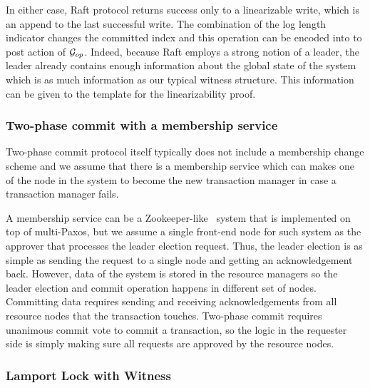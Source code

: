 In either case, Raft protocol returns success only to a
linearizable write, which is an append to the last successful write. The
combination of the log length indicator changes the committed index and this
operation can be encoded into to post action of $\mathcal{G}_{op}$. Indeed,
because Raft employs a strong notion of a leader, the leader already contains
enough information about the global state of the system which is as much
information as our typical witness structure. This information can be given to
the template for the linearizability proof. 


\subsubsection{Two-phase commit with a membership service}
Two-phase commit protocol itself typically does not include a membership
change scheme and we assume that there is a membership service which can makes one of the
node in the system to become the new transaction manager in case a transaction 
manager fails. 

A membership service can be a Zookeeper-like~\cite{zookeeper} system that is implemented on top
of multi-Paxos, but we assume a single front-end node for such system as the
approver that processes the leader election request. Thus, the leader election is 
as simple as sending the request to a single node and getting an acknowledgement back. 
However, data of the system is stored in the resource managers so the leader election and
commit operation happens in different set of nodes. Committing data requires sending
and receiving acknowledgements from all resource nodes that the transaction
touches.  Two-phase commit requires unanimous commit vote to commit a transaction, so the
logic in the requester side is simply making sure all requests are approved by
the resource nodes. 

\subsubsection{Lamport Lock with Witness}

